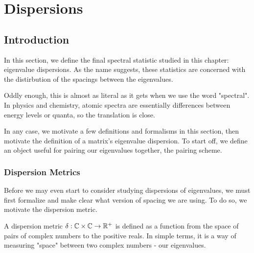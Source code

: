 
\chapter{Dispersions}

\section{Introduction}

In this section, we define the final spectral statistic studied in this chapter: eigenvalue dispersions. As the name suggests, these statistics are concerned with the distirbution of the spacings between the eigenvalues. 

Oddly enough, this is almost as literal as it gets when we use the word "spectral". In physics and chemistry, atomic spectra are essentially differences between energy levels or quanta, so the translation is close. 

In any case, we motivate a few definitions and formalisms in this section, then motivate the definition of a matrix's eigenvalue dispersion. To start off, we define an object useful for pairing our eigenvalues together, the pairing scheme.


\subsection{Dispersion Metrics}

Before we may even start to consider studying dispersions of eigenvalues, we must first formalize and make clear what version of spacing we are using. To do so, we motivate the dispersion metric.

\begin{definition}
A dispersion metric $\delta: \mathbb{C} \times \mathbb{C} \to \mathbb{R}^+$ is defined as a function from the space of pairs of complex numbers to the positive reals. In simple terms, it is a way of measuring "space" between two complex numbers - our eigenvalues.
\end{definition}

